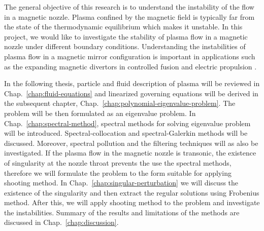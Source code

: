 The general objective of this research is to understand the instability of the flow in a magnetic nozzle. Plasma confined by the magnetic field is typically far from the state of the thermodynamic equilibrium which makes it unstable. In this project, we would like to investigate the stability of plasma flow in a magnetic nozzle under different boundary conditions. Understanding the instabilities of plasma flow in a magnetic mirror configuration is important in applications such as the expanding magnetic divertors in controlled fusion and electric propulsion \cite{ryutov_divertor_2016,kaganovich_2020_physics}.

In the following thesis, particle and fluid description of plasma will be reviewed in Chap.~\ref{chap:fluid-equations} and linearized governing equations will be derived in the subsequent chapter, Chap.~\ref{chap:polynomial-eigenvalue-problem}. The problem will be then formulated as an eigenvalue problem. In Chap.~\ref{chap:spectral-method}, spectral methods for solving eigenvalue problem will be introduced. Spectral-collocation and spectral-Galerkin methods will be discussed. Moreover, spectral pollution and the filtering techniques will as also be investigated. If the plasma flow in the magnetic nozzle is transonic, the existence of singularity at the nozzle throat prevents the use the spectral methods, therefore we will formulate the problem to the form suitable for applying shooting method. In Chap.~\ref{chap:singular-perturbation} we will discuss the existence of the singularity and then extract the regular solutions using Frobenius method. After this, we will apply shooting method to the problem and investigate the instabilities. Summary of the results and limitations of the methods are discussed in Chap.~\ref{chap:discussion}.

